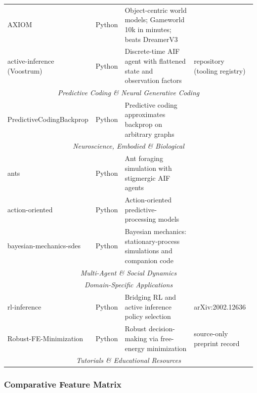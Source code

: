 \documentclass[
  english,
]{article}
\begin{document}
\begin{center}
\begin{longtable}{p{3.2cm} p{1.6cm} p{6.4cm} p{2.5cm}}
AXIOM & Python & Object-centric world models; Gameworld 10k in minutes; beats DreamerV3 & \cite{heins2025axiom} \\
active-inference (Voostrum) & Python & Discrete-time AIF agent with flattened state and observation factors & repository (tooling registry) \\
\midrule
\multicolumn{4}{c}{\textit{Predictive Coding \& Neural Generative Coding}} \\
\midrule
PredictiveCodingBackprop & Python & Predictive coding approximates backprop on arbitrary graphs & \cite{millidge2022predictive} \\
\midrule
\multicolumn{4}{c}{\textit{Neuroscience, Embodied \& Biological}} \\
\midrule
ants & Python & Ant foraging simulation with stigmergic AIF agents & \cite{heins2024collective} \\
action-oriented & Python & Action-oriented predictive-processing models & \cite{tschantz2020action} \\
bayesian-mechanics-sdes & Python & Bayesian mechanics: stationary-process simulations and companion code & \cite{sakthivadivel2023bayesian} \\
\midrule
\multicolumn{4}{c}{\textit{Multi-Agent \& Social Dynamics}} \\
\midrule
\midrule
\multicolumn{4}{c}{\textit{Domain-Specific Applications}} \\
\midrule
rl-inference & Python & Bridging RL and active inference policy selection & arXiv:2002.12636 \\
Robust-FE-Minimization & Python & Robust decision-making via free-energy minimization & source-only preprint record \\
\midrule
\multicolumn{4}{c}{\textit{Tutorials \& Educational Resources}} \\
\midrule
\end{longtable}
\end{center}

\FloatBarrier

\subsubsection{Comparative Feature
Matrix}\label{comparative-feature-matrix}
\end{document}
